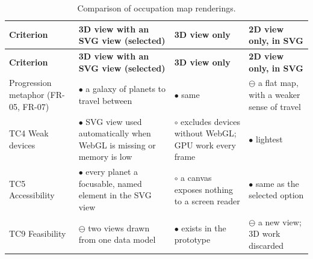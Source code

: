 {\small{}\renewcommand{\arraystretch}{1.1}
\begin{longtable}{|>{\raggedright\arraybackslash}p{}|>{\raggedright\arraybackslash}p{}|>{\raggedright\arraybackslash}p{}|>{\raggedright\arraybackslash}p{}|}
\caption{Comparison of occupation map renderings.} \\
\hline
\textbf{Criterion} & \textbf{3D view with an SVG view (selected)} & \textbf{3D view only} & \textbf{2D view only, in SVG} \\ \hline
\endfirsthead
\hline
\textbf{Criterion} & \textbf{3D view with an SVG view (selected)} & \textbf{3D view only} & \textbf{2D view only, in SVG} \\ \hline
\endhead
Progression metaphor (FR-05, FR-07) & $\bullet$ a galaxy of planets to travel between & $\bullet$ same & $\ominus$ a flat map, with a weaker sense of travel \\ \hline
TC4 Weak devices & $\bullet$ SVG view used automatically when WebGL is missing or memory is low & $\circ$ excludes devices without WebGL; GPU work every frame\cite{r139} & $\bullet$ lightest \\ \hline
TC5 Accessibility & $\bullet$ every planet a focusable, named element in the SVG view\cite{r140} & $\circ$ a canvas exposes nothing to a screen reader & $\bullet$ same as the selected option \\ \hline
TC9 Feasibility & $\ominus$ two views drawn from one data model & $\bullet$ exists in the prototype & $\ominus$ a new view; 3D work discarded \\ \hline
\end{longtable}
}

